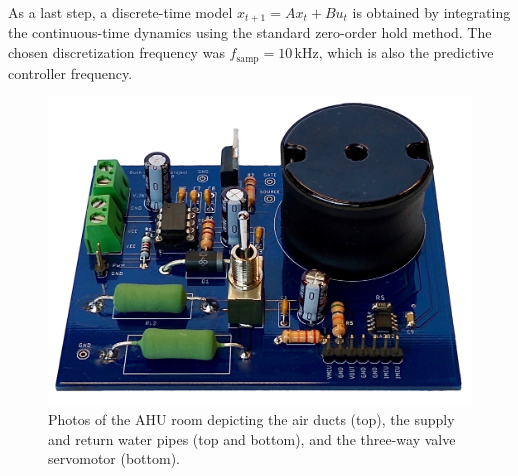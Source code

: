 As a last step, a discrete-time model $x_{t+1} = A x_{t} + B u_{t}$ is obtained by integrating the continuous-time dynamics using the standard zero-order hold method. The chosen discretization frequency was $f_{\text{samp}} = 10\,$kHz, which is also the predictive controller frequency. 

\begin{figure}[!t]
	\centering
	\includegraphics[width=0.7\linewidth]{../images/chap4_buck}
	\caption{Photos of the AHU room depicting the air ducts (top), the supply and return water pipes (top and bottom), and the three-way valve servomotor (bottom).}
	\label{fig.asd}
\end{figure}


